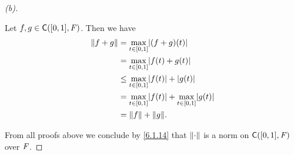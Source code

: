 \begin{proof}[(b)]
\begin{description}
      Let \(f, g \in \cfs([0, 1], \F)\).
      Then we have
      \begin{align*}
        \norm{f + g} & = \max_{t \in [0, 1]} \abs{(f + g)(t)}                            \\
                     & = \max_{t \in [0, 1]} \abs{f(t) + g(t)}                           \\
                     & \leq \max_{t \in [0, 1]} \abs{f(t)} + \abs{g(t)}                  \\
                     & = \max_{t \in [0, 1]} \abs{f(t)} + \max_{t \in [0, 1]} \abs{g(t)} \\
                     & = \norm{f} + \norm{g}.
      \end{align*}
  \end{description}
  From all proofs above we conclude by \cref{6.1.14} that \(\left\lVert\cdot\right\rVert\) is a norm on \(\cfs([0, 1], \F)\) over \(\mathit{F}\).
\end{proof}

